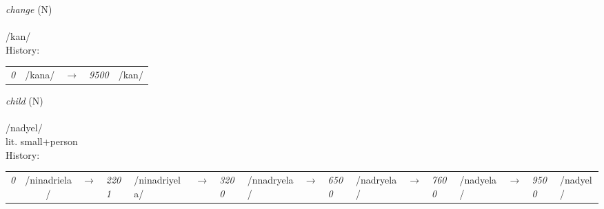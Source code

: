 \vspace{15pt}
\begin{nopagebreak}
 \textit{change} (N)\\
\\
\noindent /k{\textprimstress}an/\\


\noindent History:

\vspace{-0pt}
\hspace{40pt}
\begin{tabular}{ccc}
\textit{0} & /kana/&$\rightarrow$ & \textit{9500} & /kan/& \\
\end{tabular}

\vspace{20pt}\hline

\end{nopagebreak}
\filbreak



\vspace{15pt}
\begin{nopagebreak}
 \textit{child} (N)\\
\\
\noindent /n{\textprimstress}adyel/\\
\noindent lit. small+person\\


\noindent History:

\vspace{-0pt}
\hspace{40pt}
\begin{tabular}{ccc}
\textit{0} & /ninadriela/&$\rightarrow$ & \textit{2201} & /ninadriyela/&$\rightarrow$ & \textit{3200} & /nnadryela/&$\rightarrow$ & \textit{6500} & /nadryela/&$\rightarrow$ & \textit{7600} & /nadyela/&$\rightarrow$ & \textit{9500} & /nadyel/& \\
\end{tabular}

\vspace{20pt}\hline

\end{nopagebreak}
\filbreak



